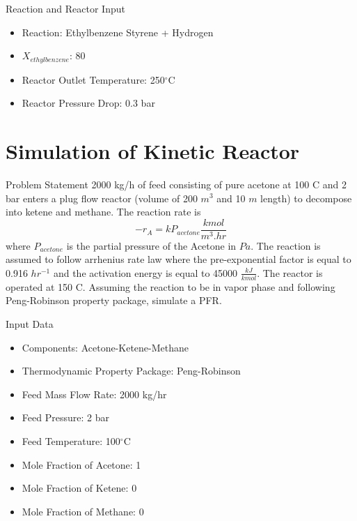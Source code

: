 \documentclass[10pt]{beamer}
\begin{document}
\begin{frame}{Reaction and Reactor Input}
	\begin{itemize}
		\item Reaction: Ethylbenzene \rightarrow Styrene + Hydrogen
		\item $X_{ethylbenzene}$: 80
		\item Reactor Outlet Temperature: 250$^\circ$C
		\item Reactor Pressure Drop: 0.3 bar
	\end{itemize}
\end{frame}


\section{Simulation of Kinetic Reactor}
\begin{frame}{Problem Statement}
	2000 kg/h of feed consisting of pure acetone at 100 \degree C and 2 bar enters a plug flow reactor (volume of 200 $m^3$ and 10 $m$ length) to decompose into ketene and methane. The reaction rate is 
	\begin{equation*}
		-r_A = kP_{acetone} \frac{kmol}{m^3.hr}
	\end{equation*}
	where $P_{acetone}$ is the partial pressure of the Acetone in $Pa$. The reaction is assumed to follow arrhenius rate law where the pre-exponential factor is equal to 0.916 $hr^{-1}$ and the activation energy is equal to
	45000 $\frac{kJ}{kmol}$. The reactor is operated at 150 \degree C. Assuming the reaction to be in vapor phase and following
	Peng-Robinson property package, simulate a PFR.
\end{frame}

\begin{frame}{Input Data}
	\begin{itemize}
		\item Components: Acetone-Ketene-Methane
		\item Thermodynamic Property Package: Peng-Robinson
		\item Feed Mass Flow Rate: 2000 kg/hr
		\item Feed Pressure: 2 bar
		\item Feed Temperature: 100$^\circ$C
		\item Mole Fraction of Acetone: 1
		\item Mole Fraction of Ketene: 0
		\item Mole Fraction of Methane: 0
	\end{itemize}
\end{frame}
\end{document}
